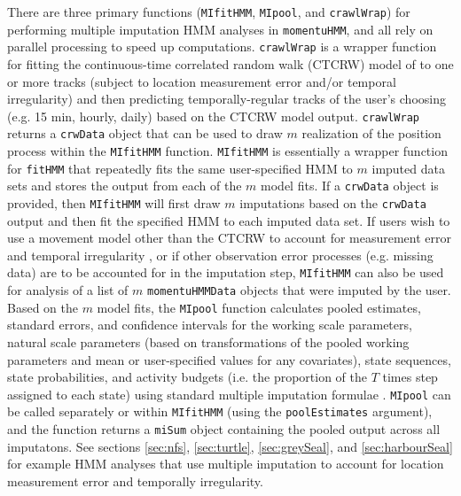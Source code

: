 \documentclass[12pt]{article}\usepackage[]{graphicx}\usepackage[]{xcolor}
\begin{document}
There are three primary functions (\verb|MIfitHMM|, \verb|MIpool|, and \verb|crawlWrap|) for performing multiple imputation HMM analyses in \verb|momentuHMM|, and all rely on parallel processing to speed up computations. \verb|crawlWrap| is a wrapper function for fitting the continuous-time correlated random walk (CTCRW) model of \cite{JohnsonEtAl2008} to one or more tracks (subject to location measurement error and/or temporal irregularity) and then predicting temporally-regular tracks of the user's choosing (e.g. 15 min, hourly, daily) based on the CTCRW model output.  \verb|crawlWrap| returns a \verb|crwData| object that can be used to draw $m$ realization of the position process within the \verb|MIfitHMM| function.  \verb|MIfitHMM| is essentially a wrapper function for \verb|fitHMM| that repeatedly fits the same user-specified HMM to $m$ imputed data sets and stores the output from each of the $m$ model fits. If a \verb|crwData| object is provided, then \verb|MIfitHMM| will first draw $m$ imputations based on the \verb|crwData| output and then fit the specified HMM to each imputed data set. If users wish to use a movement model other than the CTCRW to account for measurement error and temporal irregularity \citep[e.g.][]{CalabreseEtAl2016,GurarieEtAl2017}, or if other observation error processes (e.g. missing data) are to be accounted for in the imputation step, \verb|MIfitHMM| can also be used for analysis of a list of $m$ \verb|momentuHMMData| objects that were imputed by the user. Based on the $m$ model fits, the \verb|MIpool| function calculates pooled estimates, standard errors, and confidence intervals for the working scale parameters, natural scale parameters (based on transformations of the pooled working parameters and mean or user-specified values for any covariates), state sequences, state probabilities, and activity budgets (i.e. the proportion of the $T$ times step assigned to each state) using standard multiple imputation formulae \citep{RubinSchenker1986,McClintock2017}.  \verb|MIpool| can be called separately or within \verb|MIfitHMM| (using the \verb|poolEstimates| argument), and the function returns a \verb|miSum| object containing the pooled output across all imputatons. See sections \ref{sec:nfs}, \ref{sec:turtle}, \ref{sec:greySeal}, and \ref{sec:harbourSeal} for example HMM analyses that use multiple imputation to account for location measurement error and temporally irregularity.
\end{document}
